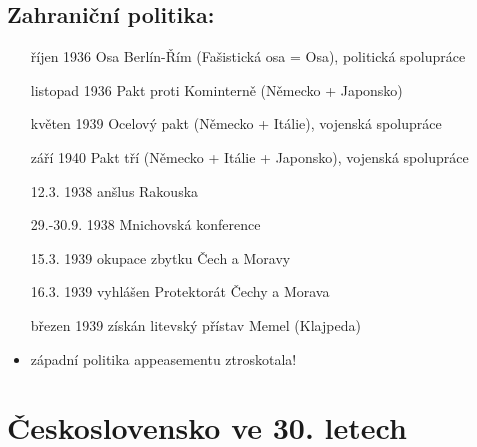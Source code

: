 \documentclass{article}
\begin{document}
\subsection*{Zahraniční politika:}
\begin{itemize}
    \item [říjen 1936] Osa Berlín-Řím (Fašistická osa = Osa), politická spolupráce
    \item [listopad 1936] Pakt proti Kominterně (Německo + Japonsko)
    \item [květen 1939] Ocelový pakt (Německo + Itálie), vojenská spolupráce
    \item [září 1940] Pakt tří (Německo + Itálie + Japonsko), vojenská spolupráce
    \item [12.3. 1938] anšlus Rakouska
    \item [29.-30.9. 1938] Mnichovská konference
    \item [15.3. 1939] okupace zbytku Čech a Moravy
    \item [16.3. 1939] vyhlášen Protektorát Čechy a Morava
    \item [březen 1939] získán litevský přístav Memel (Klajpeda)
    \item západní politika appeasementu ztroskotala!
\end{itemize}

\section*{Československo ve 30. letech}
\end{document}
